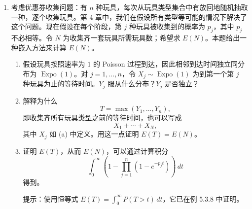 \documentclass[UTF8, 12pt, fontset=fandol, oneside]{ctexart}
\begin{document}
\begin{enumerate}
  \item 考虑优惠券收集问题：有 $n$ 种玩具，每次从玩具类型集合中有放回地随机抽取一种，逐个收集玩具。第 4 章中，我们在假设所有类型等可能的情况下解决了这个问题。现在假设在每个阶段，第 $j$ 种玩具被收集到的概率为 $p_j$，其中 $p_j$ 不必相等。令 $N$ 为收集齐一套玩具所需玩具数；希望求 $E(N)$。本题给出一种嵌入方法来计算 $E(N)$。
  \begin{enumerate}
    \item 假设玩具按照速率为 $1$ 的 Poisson 过程到达，因此相邻到达时间独立同分布为 $\operatorname{Expo}(1)$。对 $j=1,\ldots,n$，令 $X_j\sim\operatorname{Expo}(1)$ 为到第一个第 $j$ 种玩具为止的等待时间。$Y_j$ 服从什么分布？$Y_j$ 是否独立？
    \item 解释为什么
    \[
      T=\max(Y_1,\ldots,Y_n),
    \]
    即收集齐所有玩具类型之前的等待时间，也可以写成
    \[
      X_1+\cdots+X_N,
    \]
    其中 $X_j$ 如 (a) 中定义。用这一点证明 $E(T)=E(N)$。
    \item 证明 $E(T)$，从而 $E(N)$，可以通过计算积分
    \[
      \int_0^\infty
      \left(1-\prod_{j=1}^{n}(1-e^{-p_jt})\right)\,dt
    \]
    得到。

    提示：使用恒等式 $E(T)=\int_0^\infty P(T>t)\,dt$，它已在例 5.3.8 中证明。
  \end{enumerate}
\end{enumerate}
\end{document}
